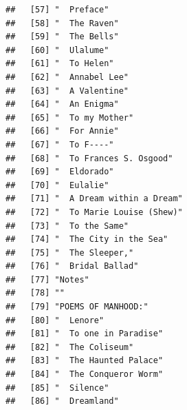 \documentclass{article}\usepackage[]{graphicx}\usepackage[]{color}
\makeatletter
\newenvironment{kframe}{%
 \def\at@end@of@kframe{}%
 \ifinner\ifhmode%
  \def\at@end@of@kframe{\end{minipage}}%
  \begin{minipage}{\columnwidth}%
 \fi\fi%
 \def\FrameCommand##1{\hskip\@totalleftmargin \hskip-\fboxsep
 \colorbox{shadecolor}{##1}\hskip-\fboxsep
     \hskip-\linewidth \hskip-\@totalleftmargin \hskip\columnwidth}%
 \MakeFramed {\advance\hsize-\width
   \@totalleftmargin\z@ \linewidth\hsize
   \@setminipage}}%
 {\par\unskip\endMakeFramed%
 \at@end@of@kframe}
\newenvironment{knitrout}{}{} %
\makeatother
\begin{document}
\begin{knitrout}
\begin{kframe}
\begin{verbatim}
##   [57] "  Preface"                                                                   
##   [58] "  The Raven"                                                                 
##   [59] "  The Bells"                                                                 
##   [60] "  Ulalume"                                                                   
##   [61] "  To Helen"                                                                  
##   [62] "  Annabel Lee"                                                               
##   [63] "  A Valentine"                                                               
##   [64] "  An Enigma"                                                                 
##   [65] "  To my Mother"                                                              
##   [66] "  For Annie"                                                                 
##   [67] "  To F----"                                                                  
##   [68] "  To Frances S. Osgood"                                                      
##   [69] "  Eldorado"                                                                  
##   [70] "  Eulalie"                                                                   
##   [71] "  A Dream within a Dream"                                                    
##   [72] "  To Marie Louise (Shew)"                                                    
##   [73] "  To the Same"                                                               
##   [74] "  The City in the Sea"                                                       
##   [75] "  The Sleeper,"                                                              
##   [76] "  Bridal Ballad"                                                             
##   [77] "Notes"                                                                       
##   [78] ""                                                                            
##   [79] "POEMS OF MANHOOD:"                                                           
##   [80] "  Lenore"                                                                    
##   [81] "  To one in Paradise"                                                        
##   [82] "  The Coliseum"                                                              
##   [83] "  The Haunted Palace"                                                        
##   [84] "  The Conqueror Worm"                                                        
##   [85] "  Silence"                                                                   
##   [86] "  Dreamland"                                                                 

\end{verbatim}
\end{kframe}
\end{knitrout}
\end{document}
